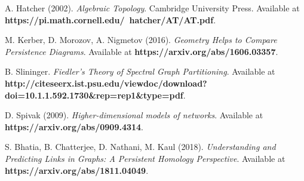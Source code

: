 \documentclass[12pt,a4paper]{amsart}
\numberwithin{equation}{section}
\theoremstyle{plain}
\theoremstyle{definition}
\begin{document}
\begin{thebibliography}{99}

 A. Hatcher (2002). \textit{Algebraic Topology}. Cambridge University Press. Available at \textbf{https://pi.math.cornell.edu/~hatcher/AT/AT.pdf}.

 M. Kerber, D. Morozov, A. Nigmetov (2016). \textit{Geometry Helps to Compare Persistence Diagrams}. Available at \textbf{https://arxiv.org/abs/1606.03357}.

 B. Slininger. \textit{Fiedler's Theory of Spectral Graph Partitioning}. Available at \textbf{http://citeseerx.ist.psu.edu/viewdoc/download?doi=10.1.1.592.1730\&rep=rep1\&type=pdf}.

 D. Spivak (2009). \textit{Higher-dimensional models of networks}. Available at \textbf{https://arxiv.org/abs/0909.4314}.

 S. Bhatia, B. Chatterjee, D. Nathani, M. Kaul (2018). \textit{Understanding and Predicting Links in Graphs: A Persistent Homology Perspective}. Available at \textbf{https://arxiv.org/abs/1811.04049}.

\end{thebibliography}
\end{document}
